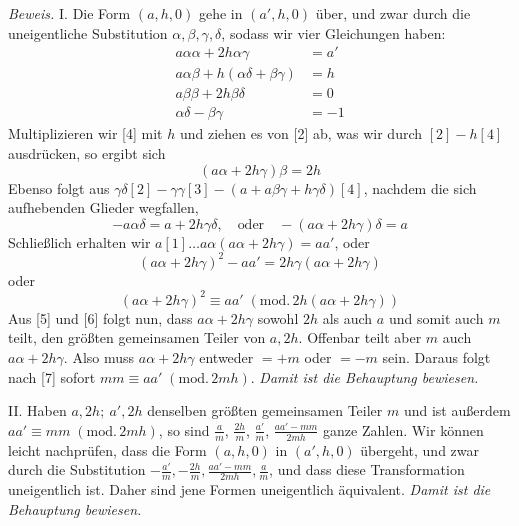 \textit{Beweis.} I. Die Form $(a,h,0)$ gehe in $(a',h,0)$ über, und zwar durch die uneigentliche Substitution $\alpha,\beta,\gamma,\delta$, sodass wir vier Gleichungen haben:
\begin{align*}
a\alpha\alpha+2h\alpha\gamma&=a'\tag*{. . . . . . . . . . . . [1]}\\
a\alpha\beta+h(\alpha\delta+\beta\gamma)&=h\tag*{. . . . . . . . . . [2]}\\
a\beta\beta+2h\beta\delta&=0\tag*{. . . . . . . . . . . . [3]}\\
\alpha\delta-\beta\gamma&=-1\tag*{. . . . . . . . . . . . . [4]}
\end{align*}
Multiplizieren wir [4] mit $h$ und ziehen es von [2] ab, was wir durch $[2]-h[4]$ ausdrücken, so ergibt sich
\begin{equation*}
(a\alpha+2h\gamma)\beta=2h\tag*{. . . . . . . . . . . . [5]}
\end{equation*}
Ebenso folgt aus $\gamma\delta[2]-\gamma\gamma[3]-(a+a\beta\gamma+h\gamma\delta)[4]$, nachdem die sich aufhebenden Glieder wegfallen,
\begin{equation*}
-a\alpha\delta=a+2h\gamma\delta,\quad\text{oder}\quad -(a\alpha+2h\gamma)\delta=a\tag*{. . [6]}
\end{equation*}
Schließlich erhalten wir $a[1]\ldots a\alpha(a\alpha+2h\gamma)=aa'$, oder
\[
(a\alpha+2h\gamma)^2-aa'=2h\gamma(a\alpha+2h\gamma)
\]
oder
\begin{equation*}
(a\alpha+2h\gamma)^2\equiv aa'\;(\mathrm{mod.}\,2h(a\alpha+2h\gamma))\tag*{. . . . . [7]}
\end{equation*}
Aus [5] und [6] folgt nun, dass $a\alpha+2h\gamma$ sowohl $2h$ als auch $a$ und somit auch $m$ teilt, den größten gemeinsamen Teiler von $a,2h$. Offenbar teilt aber $m$ auch $a\alpha+2h\gamma$. Also muss $a\alpha+2h\gamma$ entweder $=+m$ oder $=-m$ sein. Daraus folgt nach [7] sofort $mm\equiv aa'\;(\mathrm{mod.}\,2mh)$. \textit{Damit ist die Behauptung bewiesen.}

II. Haben $a,2h;\ a',2h$ denselben größten gemeinsamen Teiler $m$ und ist außerdem $aa'\equiv mm\;(\mathrm{mod.}\,2mh)$, so sind $\frac a m$, $\frac{2h}{m}$, $\frac{a'}{m}$, $\frac{aa'-mm}{2mh}$ ganze Zahlen. Wir können leicht nachprüfen, dass die Form $(a,h,0)$ in $(a',h,0)$ übergeht, und zwar durch die Substitution $-\frac{a'}{m},-\frac{2h}{m},\frac{aa'-mm}{2mh},\frac a m$, und dass diese Transformation uneigentlich ist. Daher sind jene Formen uneigentlich äquivalent. \textit{Damit ist die Behauptung bewiesen.}

